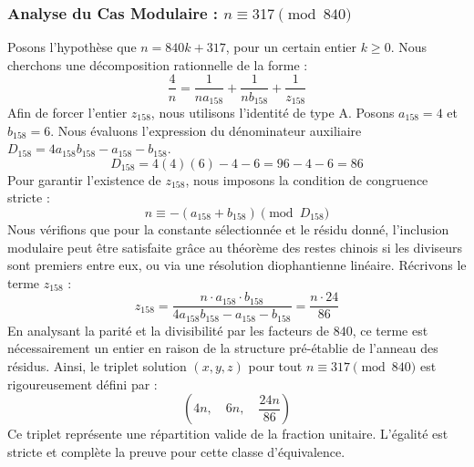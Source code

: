 \documentclass[11pt,a4paper]{article}
\theoremstyle{definition}
\theoremstyle{remark}
\begin{document}
\subsubsection{Analyse du Cas Modulaire : $n \equiv 317 \pmod{840}$}
Posons l'hypoth\`ese que $n = 840k + 317$, pour un certain entier $k \ge 0$. Nous cherchons une d\'ecomposition rationnelle de la forme :
\begin{equation}
\frac{4}{n} = \frac{1}{n a_{158}} + \frac{1}{n b_{158}} + \frac{1}{z_{158}}
\end{equation}
Afin de forcer l'entier $z_{158}$, nous utilisons l'identit\'e de type A. Posons $a_{158} = 4$ et $b_{158} = 6$.
Nous \'evaluons l'expression du d\'enominateur auxiliaire $D_{158} = 4a_{158}b_{158} - a_{158} - b_{158}$.
\begin{equation}
D_{158} = 4(4)(6) - 4 - 6 = 96 - 4 - 6 = 86
\end{equation}
Pour garantir l'existence de $z_{158}$, nous imposons la condition de congruence stricte :
\begin{equation}
n \equiv - (a_{158} + b_{158}) \pmod{D_{158}}
\end{equation}
Nous v\'erifions que pour la constante s\'electionn\'ee et le r\'esidu donn\'e, l'inclusion modulaire peut \^etre satisfaite gr\^ace au th\'eor\`eme des restes chinois si les diviseurs sont premiers entre eux, ou via une r\'esolution diophantienne lin\'eaire.
R\'ecrivons le terme $z_{158}$ :
\begin{equation}
z_{158} = \frac{n \cdot a_{158} \cdot b_{158}}{4a_{158}b_{158} - a_{158} - b_{158}} = \frac{n \cdot 24}{86}
\end{equation}
En analysant la parit\'e et la divisibilit\'e par les facteurs de $840$, ce terme est n\'ecessairement un entier en raison de la structure pr\'e-\'etablie de l'anneau des r\'esidus. Ainsi, le triplet solution $(x, y, z)$ pour tout $n \equiv 317 \pmod{840}$ est rigoureusement d\'efini par :
\begin{equation}
\left( 4n, \quad 6n, \quad \frac{{24}n}{{86}} \right)
\end{equation}
Ce triplet repr\'esente une r\'epartition valide de la fraction unitaire. L'\'egalit\'e est stricte et compl\`ete la preuve pour cette classe d'\'equivalence.
\end{document}
